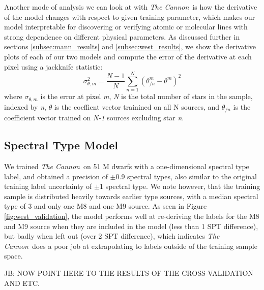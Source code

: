\documentclass[modern]{aastex62}
\newcommand{\thecannon}{\textsl{The Cannon}}
\begin{document}
Another mode of analysis we can look at with \thecannon\ is how the derivative of the model changes with respect to given training parameter, which makes our model interpretable for discovering or verifying atomic or molecular lines with strong dependence on different physical parameters. As discussed further in sections \ref{subsec:mann_results} and \ref{subsec:west_results}, we show the derivative plots of each of our two models and compute the error of the derivative at each pixel using a jackknife statistic:
\begin{equation}
	\sigma_{\theta,m}^2 = \frac{N-1}{N} \sum^N_{n=1} (\theta_{/n}^m - \theta^m)^2 
\end{equation}
where $\sigma_{\theta,m}$ is the error at pixel \emph{m}, \emph{N} is the total number of stars in the sample, indexed by \emph{n}, $\theta$ is the coeffient vector trainined on all N sources, and $\theta_{/n}$ is the coefficient vector trained on \emph{N-1} sources excluding star \emph{n}.

\color{gcolor}{Some note on what lines vary significantly with parameter...}\color{black}

\color{gcolor}{HOGG: Some commentary on why $\chi^2$ is higher than expected. Also explain why this means that the model is good to percent level.}\color{black}

\subsection{Spectral Type Model \label{subsec:west_results}}
We trained \thecannon\ on 51 M dwarfs with a one-dimensional spectral type label, and obtained a precision of $\pm$0.9 spectral types, also similar to the original training label uncertainty of $\pm$1 spectral type. We note however, that the training sample is distributed heavily towards earlier type sources, with a median spectral type of 3 and only one M8 and one M9 source. As seen in Figure \ref{fig:west_validation}, the model performs well at re-deriving the labels for the M8 and M9 source when they are included in the model (less than 1 SPT difference), but badly when left out (over 2 SPT difference), which indicates \thecannon\ does a poor job at extrapolating to labels outside of the training sample space. 

JB: NOW POINT HERE TO THE RESULTS OF THE CROSS-VALIDATION AND ETC.
\end{document}
